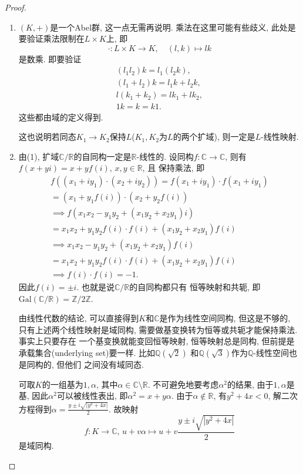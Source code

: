 \begin{proof}
\begin{enumerate}[(1)]
    \item $(K, +)$是一个Abel群, 这一点无需再说明. 乘法在这里可能有些歧义,
    此处是要验证乘法限制在$L \times K$上, 即
    \[
        \cdot: L \times K \to K, \quad (l, k) \mapsto lk
    \]
    是数乘. 即要验证
    \[
    \begin{gathered}
        (l_1l_2)k = l_1(l_2k),\\
        (l_1 + l_2)k = l_1k + l_2k,\\
        l(k_1 + k_2) = lk_1 + lk_2,\\
        1k = k = k1.
    \end{gathered}
    \]
    这些都由域的定义得到.

    这也说明若同态$K_1 \to K_2$保持$L$($K_1, K_2$为$L$的两个扩域),
    则一定是$L$-线性映射.
    \item 由(1), 扩域$\mathbb{C}/\mathbb{R}$的自同构一定是$\mathbb{R}$-线性的.
    设同构$f: \mathbb{C} \to \mathbb{C}$, 则有
    $f(x + yi) = x + yf(i),\, x, y \in \mathbb{R}$, 且
    保持乘法, 即
    \[
    \begin{gathered}
        f\left((x_1 + iy_1) \cdot (x_2 + iy_2)\right) = f(x_1 + iy_1) \cdot f(x_1 + iy_1) \\= (x_1 + y_1f(i)) \cdot (x_2 + y_2f(i))\\
        \implies f\left(x_1x_2 - y_1y_2 + (x_1y_2 +x_2y_1)i\right) \\= x_1x_2 + y_1y_2f(i) \cdot f(i) + (x_1y_2 +x_2y_1)f(i)\\
        \implies x_1x_2 - y_1y_2 + (x_1y_2 +x_2y_1)f(i) \\= x_1x_2 + y_1y_2f(i) \cdot f(i) + (x_1y_2 +x_2y_1)f(i)\\
        \implies f(i) \cdot f(i) = -1.
    \end{gathered} 
    \]
    因此$f(i) = \pm i$. 也就是说$\mathbb{C}/\mathbb{R}$的自同构都只有
    恒等映射和共轭, 即$\mathrm{Gal}(\mathbb{C}/\mathbb{R}) = \mathbb{Z}/2\mathbb{Z}$.

    由线性代数的结论, 可以直接得到$K$和$\mathbb{C}$是作为线性空间同构, 但这是不够的,
    只有上述两个线性映射是域同构, 需要做基变换转为恒等或共轭才能保持乘法. 事实上只要存在
    一个基变换就能变回恒等映射, 恒等映射总是同构,
    但前提是承载集合(underlying set)要一样. 比如$\mathbb{Q}(\sqrt{2})$
    和$\mathbb{Q}(\sqrt{3})$作为$\mathbb{Q}$-线性空间也是同构的, 但他们
    之间没有域同态.

    可取$K$的一组基为$1, \alpha$, 其中$\alpha \in \mathbb{C} \setminus \mathbb{R}$.
    不可避免地要考虑$\alpha^2$的结果, 由于$1, \alpha$是基, 因此$\alpha^2$可以被线性表出,
    即$\alpha^2 = x + y\alpha$. 由于$\alpha \notin \mathbb{R}$, 有$y^2 + 4x < 0$,
    解二次方程得到$\alpha = \frac{y \pm i\sqrt{|y^2 + 4x|}}{2}$.
    故映射
\[
    f: K \to \mathbb{C},\, u + v\alpha \mapsto u + v\frac{y \pm i\sqrt{|y^2 + 4x|}}{2}
\]
    是域同构.
\end{enumerate}
\end{proof}


